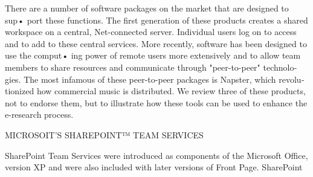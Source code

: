 \documentclass[a4paper,12pt]{article}
\begin{document}
\begin{latin}
There are a number of software packages on the market that are designed to sup• port these functions. The first generation  of these products creates a shared workspace on a central,  Net-connected server.  Individual  users  log  on to access and to add to these central  services. More recently,  software has been designed  to use the comput• ing power  of remote users more extensively  and  to  allow team  members to  share resources and communicate through  "peer-to-peer" technologies. The most infamous of these  peer-to-peer packages  is Napster,  which  revolutionized how  commercial music is distributed.  We  review three  of these products,  not to endorse  them,  but to illustrate  how these tools can be used to enhance  the e-research process.
 \vspace{0.1cm}
\vspace{0.1cm}


MICROSOIT'S SHAREPOINT™ TEAM SERVICES
 \vspace{0.1cm}
\vspace{0.1cm}

\noindent
SharePoint Team Services were introduced  as components  of the Microsoft Office, version  XP  and  were also included  with  later  versions  of Front   Page.  SharePoint 






\end{latin}
\end{document}
